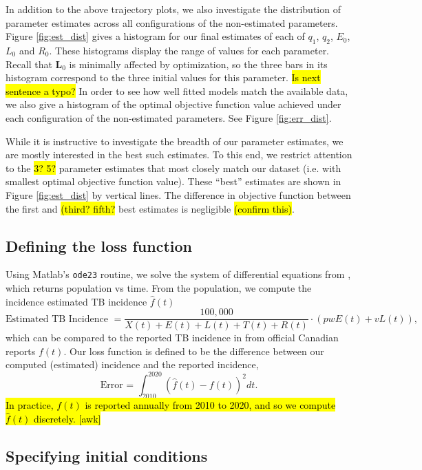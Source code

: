 \documentclass[sn-mathphys,Numbered]{sn-jnl}%
\newcommand{\cL}{\mathbf{L}}
\theoremstyle{thmstyleone}%
\theoremstyle{thmstyletwo}%
\theoremstyle{thmstylethree}%
\begin{document}
In addition to the above trajectory plots, we also investigate the distribution of parameter estimates across all configurations of the non-estimated parameters. Figure \ref{fig:est_dist} gives a histogram for our final estimates of each of $q_1$, $q_2$, $E_0$, $L_0$ and $R_0$. These histograms display the range of values for each parameter. Recall that $\cL_0$ is minimally affected by optimization, so the three bars in its histogram correspond to the three initial values for this parameter. \hl{Is next sentence a typo?} In order to see how well fitted models match the available data, we also give a histogram of the optimal objective function value achieved under each configuration of the non-estimated parameters. See Figure \ref{fig:err_dist}.







While it is instructive to investigate the breadth of our parameter estimates, we are mostly interested in the best such estimates. To this end, we restrict attention to the \hl{3? 5?} parameter estimates that most closely match our dataset (i.e. with smallest optimal objective function value). These ``best'' estimates are shown in Figure \ref{fig:est_dist} by vertical lines. The difference in objective function between the first and \hl{(third? fifth?} best estimates is negligible \hl{(confirm this)}.


\subsection{Defining the loss function}

Using Matlab's \texttt{ode23} routine, we solve the system of differential equations from \cite{Guo2011PersistentLatency}, which returns population vs time.  From the population, we compute the incidence estimated TB incidence $\hat{f}(t)$
  	$$\text{Estimated TB Incidence } = \frac{100,000}{X(t)+E(t)+L(t)+T(t)+R(t)} \cdot (pw E(t) + v L(t)) ,$$
which can be compared to the reported TB incidence in from official Canadian reports $f(t)$\cite{MounchiliA.2022TuberculosisReport}.  Our loss function is defined to be the difference between our computed (estimated) incidence and the reported incidence,
 $$ \text{Error = } \int_{2010}^{2020} (\hat{f}(t) - f(t))^2 dt. $$
\hl{In practice, $f(t)$ is reported annually from 2010 to 2020, and so we compute $\hat{f}(t)$ discretely. [awk]} 


\subsection{Specifying initial conditions}
\end{document}
